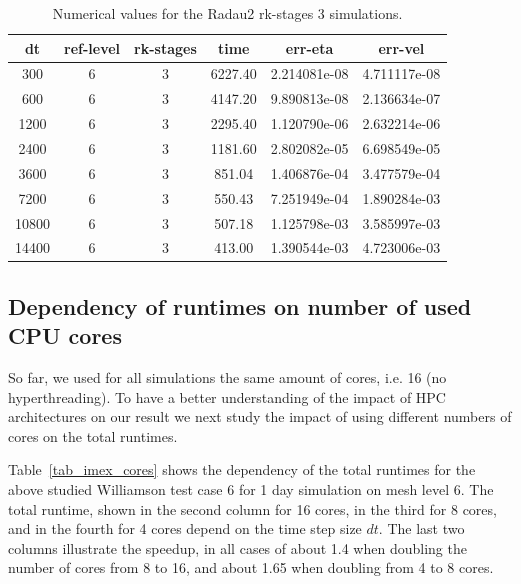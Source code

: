 \documentclass[a4paper, 12pt]{article}
\begin{document}
\begin{table}[h]\centering
\begin{tabular}{c|c|c|c|c|c}
dt    & ref-level &  rk-stages & time    & err-eta      &    err-vel \\ \hline
300    &       6   &        3  & 6227.40 &  2.214081e-08 &  4.711117e-08\\
600    &       6   &        3 &  4147.20 &  9.890813e-08 &  2.136634e-07\\
1200    &       6  &         3&   2295.40 &  1.120790e-06 &  2.632214e-06\\
2400    &       6  &         3 &  1181.60 &  2.802082e-05 &  6.698549e-05\\
3600    &       6  &         3 &   851.04 &  1.406876e-04 &  3.477579e-04\\
7200    &       6  &         3  &  550.43 &  7.251949e-04 &  1.890284e-03\\
10800   &        6  &         3 &   507.18 &  1.125798e-03 &  3.585997e-03\\
14400     &      6  &         3 &   413.00 &  1.390544e-03 &  4.723006e-03\\
\end{tabular}
\caption{Numerical values for the Radau2 rk-stages 3 simulations.}
\end{table}





\cleardoublepage



\subsection{Dependency of runtimes on number of used CPU cores}


So far, we used for all simulations the same amount of cores, i.e. 16 (no hyperthreading). To have a better understanding of the impact of HPC architectures on our result we next study the impact of using different numbers of cores on the total runtimes.

Table~\ref{tab_imex_cores} shows the dependency of the total runtimes for the above studied Williamson test case 6 for 1 day simulation on mesh level 6. The total runtime, shown in the second column for 16 cores, in the third for 8 cores, and in the fourth for 4 cores depend on the time step size $dt$. The last two columns illustrate the speedup, in all cases of about 1.4 when doubling the number of cores from 8 to 16, and about 1.65 when doubling from 4 to 8 cores.
\end{document}

